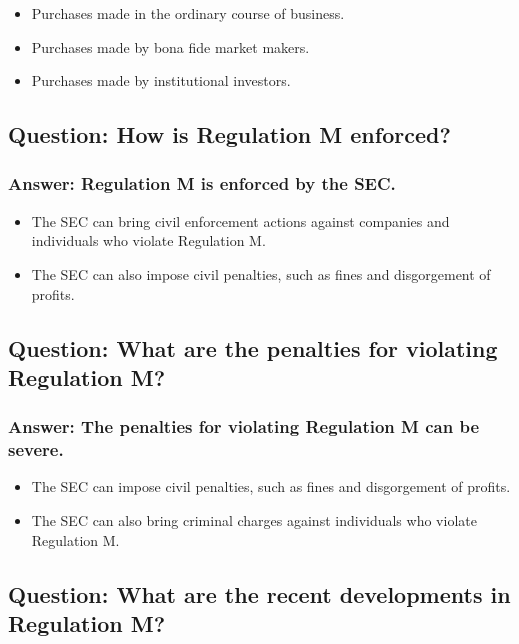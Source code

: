 \documentclass[11pt]{article}
\begin{document}
\begin{itemize}
\item Purchases made in the ordinary course of business.
\item Purchases made by bona fide market makers.
\item Purchases made by institutional investors.
\end{itemize}
\subsection{Question: How is Regulation M enforced?}
\label{sec:orgd4138f3}

\subsubsection{Answer: Regulation M is enforced by the SEC.}
\label{sec:orgf3cf2a6}
\begin{itemize}
\item The SEC can bring civil enforcement actions against companies and individuals who violate Regulation M.
\item The SEC can also impose civil penalties, such as fines and disgorgement of profits.
\end{itemize}

\subsection{Question: What are the penalties for violating Regulation M?}
\label{sec:org321b355}

\subsubsection{Answer: The penalties for violating Regulation M can be severe.}
\label{sec:orga9c22e9}
\begin{itemize}
\item The SEC can impose civil penalties, such as fines and disgorgement of profits.
\item The SEC can also bring criminal charges against individuals who violate Regulation M.
\end{itemize}

\subsection{Question: What are the recent developments in Regulation M?}
\label{sec:orgc6ea619}
\end{document}
